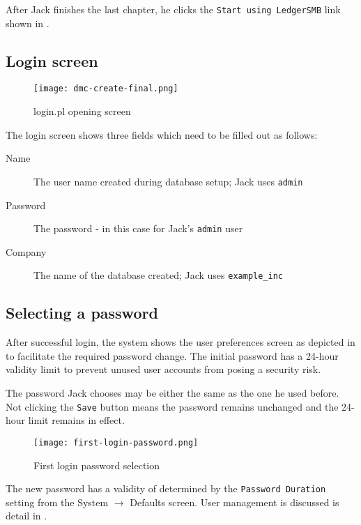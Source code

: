 After Jack finishes the last chapter, he clicks the \texttt{Start using LedgerSMB} link
shown in .


\subsection{Login screen}
\label{subsec-first-login-screen}

\begin{figure}[h]
\centering
\texttt{[image: dmc-create-final.png]}
\caption{login.pl opening screen}
\label{fig:login-screen}
\end{figure}

The login screen shows three fields which need to be filled out as follows:

\begin{description}
\item[Name] The user name created during database setup; Jack uses \texttt{admin}
\item[Password] The password - in this case for Jack's \texttt{admin} user
\item[Company] The name of the database created; Jack uses \texttt{example\_inc}
\end{description}

\subsection{Selecting a password}
\label{subsec-first-login-password}

After successful login, the system shows the user preferences screen as depicted in
 to facilitate the required password change. The
initial password has a 24-hour validity limit to prevent unused user accounts from posing
a security risk.

The password Jack chooses may be either the same as the one he used before.
Not clicking the \texttt{Save} button means the password remains unchanged and the
24-hour limit remains in effect.

\begin{figure}[h]
\centering
\texttt{[image: first-login-password.png]}
\caption{First login password selection}
\label{fig:first-login-password}
\end{figure}

The new password has a validity of determined by the \texttt{Password Duration} setting
from the System $\rightarrow$ Defaults screen. User management is discussed is detail in .

